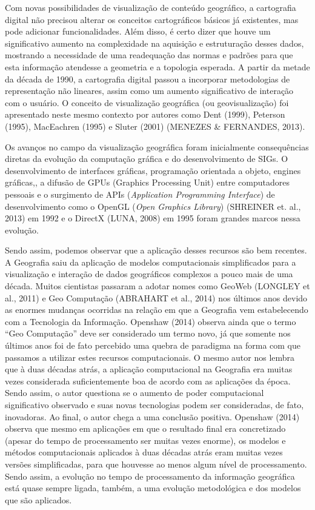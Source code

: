 Com novas possibilidades de visualização de conteúdo geográfico, a cartografia digital não precisou alterar os conceitos cartográficos básicos já existentes, mas pode adicionar funcionalidades. Além disso, é certo dizer que houve um significativo aumento na complexidade na aquisição e estruturação desses dados, mostrando a necessidade de uma readequação das normas e padrões para que esta informação atendesse a geometria e a topologia esperada. A partir da metade da década de 1990, a cartografia digital passou a incorporar metodologias de representação não lineares, assim como um aumento significativo de interação com o usuário. O conceito de visualização geográfica (ou geovisualização) foi apresentado neste mesmo contexto por autores como Dent (1999)\cite{DENT}, Peterson (1995)\cite{PETERSON}, MacEachren (1995)\cite{MacEACHREN} e Sluter (2001)\cite{SLUTER} (MENEZES \& FERNANDES, 2013)\cite{MENEZES_FERNANDES}. 

Os avanços no campo da visualização geográfica foram inicialmente consequências diretas da evolução da computação gráfica e do desenvolvimento de SIGs. O desenvolvimento de interfaces gráficas, programação orientada a objeto, engines gráficas,, a difusão de GPUs (Graphics Processing Unit) entre computadores pessoais e o surgimento de APIs (\textit{Application Programming Interface}) de desenvolvimento como o OpenGL (\textit{Open Graphics Library}) (SHREINER et. al., 2013)\cite{SHREINER_etal13} em 1992 e o DirectX (LUNA, 2008)\cite{LUNA} em 1995 foram grandes marcos nessa evolução. 

Sendo assim, podemos observar que a aplicação desses recursos são bem recentes. A Geografia saiu da aplicação de modelos computacionais simplificados para a visualização e interação de dados geográficos complexos a pouco mais de uma década. Muitos cientistas passaram a adotar nomes como GeoWeb (LONGLEY et al., 2011)\cite{LONGLEY_etal13}  e Geo Computação (ABRAHART et al., 2014)\cite{ABRAHART} nos últimos anos devido as enormes mudanças ocorridas na relação em que a Geografia vem estabelecendo com a Tecnologia da Informação. Openshaw (2014)\cite{OPENSHAW} observa ainda que o termo “Geo Computação” deve ser considerado um termo novo, já que somente nos últimos anos foi de fato percebido uma quebra de paradigma na forma com que passamos a utilizar estes recursos computacionais. O mesmo autor nos lembra que à duas décadas atrás, a aplicação computacional na Geografia era muitas vezes considerada suficientemente boa de acordo com as aplicações da época. Sendo assim, o autor questiona se o aumento de poder computacional significativo observado e suas novas tecnologias podem ser consideradas, de fato, inovadoras. Ao final, o autor chega a uma conclusão positiva. Openshaw (2014)\cite{OPENSHAW} observa que mesmo em aplicações em que o resultado final era concretizado (apesar do tempo de processamento ser muitas vezes enorme), os modelos e métodos computacionais aplicados à duas décadas atrás eram muitas vezes versões simplificadas, para que houvesse ao menos algum nível de processamento. Sendo assim, a evolução no tempo de processamento da informação geográfica está quase sempre ligada, também, a uma evolução metodológica e dos modelos que são aplicados. 


